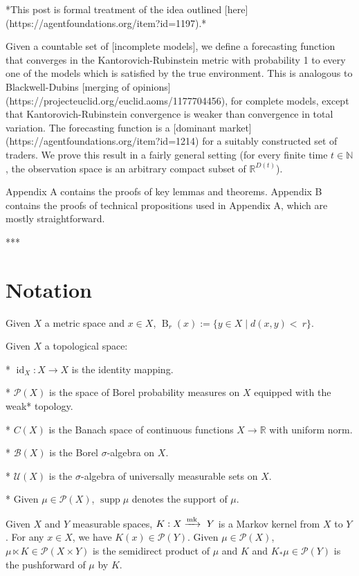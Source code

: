 \documentclass[a4paper]{article}
\DeclareMathOperator{\Supp}{supp}
\newcommand{\Nats}{\mathbb{N}}
\newcommand{\Reals}{\mathbb{R}}
\newcommand{\Markov}{\xrightarrow{\textnormal{mk}}}
\newcommand{\Prob}{\mathcal{P}}
\newcommand{\UM}{\mathcal{U}}
\newcommand{\I}{\operatorname{id}}
\newcommand{\Ball}{\operatorname{B}}
\begin{document}
*This post is formal treatment of the idea outlined [here](https://agentfoundations.org/item?id=1197).*

Given a countable set of [incomplete models], we define a forecasting function that converges in the Kantorovich-Rubinstein metric with probability 1 to every one of the models which is satisfied by the true environment. This is analogous to Blackwell-Dubins [merging of opinions](https://projecteuclid.org/euclid.aoms/1177704456), for complete models, except that Kantorovich-Rubinstein convergence is weaker than convergence in total variation. The forecasting function is a [dominant market](https://agentfoundations.org/item?id=1214) for a suitably constructed set of traders. We prove this result in a fairly general setting (for every finite time $t \in \Nats$, the observation space is an arbitrary compact subset of $\Reals^{D(t)}$).%

Appendix A contains the proofs of key lemmas and theorems. Appendix B contains the proofs of technical propositions used in Appendix A, which are mostly straightforward.

***

\section{Notation}

Given ${X}$ a metric space and ${x \in X}$, ${\Ball_r(x):=\{y \in X \mid d(x,y) <\ r\}}$.

Given ${X}$ a topological space:

* ${\I_X: X \rightarrow X}$ is the identity mapping.

* ${\Prob(X)}$ is the space of Borel probability measures on ${X}$ equipped with the weak* topology.

* ${C(X)}$ is the Banach space of continuous functions ${X \rightarrow \Reals}$ with uniform norm.

* ${\mathcal{B}}(X)$ is the Borel ${\sigma}$-algebra on ${X}$.

* ${\UM(X)}$ is the ${\sigma}$-algebra of universally measurable sets on ${X}$.

* Given ${\mu \in \Prob(X)}$, ${\Supp \mu}$ denotes the support of ${\mu}$. 

Given ${X}$ and ${Y}$ measurable spaces, ${K: X \Markov\ Y}$ is a Markov kernel from ${X}$ to ${Y}$. For any ${x \in X}$, we have ${K(x) \in \Prob(Y)}$. Given ${\mu \in \Prob(X)}$, ${\mu \ltimes K \in \Prob(X \times Y)}$ is the semidirect product of ${\mu}$ and ${K}$ and ${K_*\mu \in \Prob(Y)}$ is the pushforward of ${\mu}$ by ${K}$.
\end{document}
